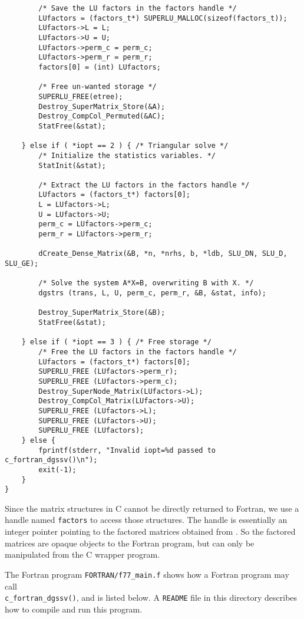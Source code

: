 \begin{verbatim}
        /* Save the LU factors in the factors handle */
        LUfactors = (factors_t*) SUPERLU_MALLOC(sizeof(factors_t));
        LUfactors->L = L;
        LUfactors->U = U;
        LUfactors->perm_c = perm_c;
        LUfactors->perm_r = perm_r;
        factors[0] = (int) LUfactors;

        /* Free un-wanted storage */
        SUPERLU_FREE(etree);
        Destroy_SuperMatrix_Store(&A);
        Destroy_CompCol_Permuted(&AC);
        StatFree(&stat);

    } else if ( *iopt == 2 ) { /* Triangular solve */
        /* Initialize the statistics variables. */
        StatInit(&stat);

        /* Extract the LU factors in the factors handle */
        LUfactors = (factors_t*) factors[0];
        L = LUfactors->L;
        U = LUfactors->U;
        perm_c = LUfactors->perm_c;
        perm_r = LUfactors->perm_r;

        dCreate_Dense_Matrix(&B, *n, *nrhs, b, *ldb, SLU_DN, SLU_D, SLU_GE);

        /* Solve the system A*X=B, overwriting B with X. */
        dgstrs (trans, L, U, perm_c, perm_r, &B, &stat, info);

        Destroy_SuperMatrix_Store(&B);
        StatFree(&stat);

    } else if ( *iopt == 3 ) { /* Free storage */
        /* Free the LU factors in the factors handle */
        LUfactors = (factors_t*) factors[0];
        SUPERLU_FREE (LUfactors->perm_r);
        SUPERLU_FREE (LUfactors->perm_c);
        Destroy_SuperNode_Matrix(LUfactors->L);
        Destroy_CompCol_Matrix(LUfactors->U);
        SUPERLU_FREE (LUfactors->L);
        SUPERLU_FREE (LUfactors->U);
        SUPERLU_FREE (LUfactors);
    } else {
        fprintf(stderr, "Invalid iopt=%d passed to c_fortran_dgssv()\n");
        exit(-1);
    }
}
\end{verbatim}

Since the matrix structures in C
cannot be directly returned to Fortran, we use a handle named {\tt factors}
to access those structures. The handle is essentially
an integer pointer pointing to the factored matrices obtained from {\superlu}.
So the factored matrices are opaque objects to the Fortran program, but
can only be manipulated from the C wrapper program.

The Fortran program {\tt FORTRAN/f77\_main.f} shows how a Fortran program may
call\\
{\tt c\_fortran\_dgssv()}, and is listed below.
A {\tt README} file in this directory describes how to compile
and run this program.

